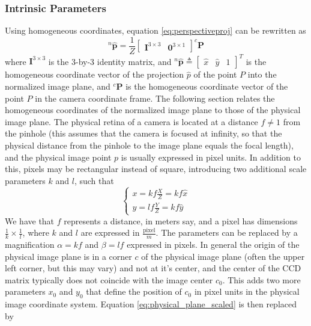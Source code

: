 \subsubsection{Intrinsic Parameters}
\label{section:intrinsic_params}
Using homogeneous coordinates, equation \ref{eq:perspectiveproj} can be rewritten as
\begin{equation}
\label{eq:homo}
^n\mathbf{\hat{p}}=\frac{1}{Z}\begin{bmatrix}\mathbf{I}^{3\times3} & \mathbf{0}^{3\times1}\end{bmatrix}^c\mathbf{P}
\end{equation}
where $\mathbf{I}^{3\times3}$ is the 3-by-3 identity matrix, and $^n\mathbf{\hat{p}}\triangleq \begin{bmatrix}\hat{x}&\hat{y}&1\end{bmatrix}^T$ is the homogeneous coordinate vector of the projection $\hat{p}$ of the point $P$ into the normalized image plane, and $^c\mathbf{P}$ is the homogeneous coordinate vector of the point $P$ in the camera coordinate frame. The following section relates the homogeneous coordinates of the normalized image plane to those of the physical image plane. The physical retina of a camera is located at a distance $f\neq1$ from the pinhole (this assumes that the camera is focused at infinity, so that the physical distance from the pinhole to the image plane equals the focal length), and the physical image point $p$ is usually expressed in pixel units. In addition to this, pixels may be rectangular instead of square, introducing two additional scale parameters $k$ and $l$, such that
\begin{equation}
\label{eq:physical_plane_scaled}
    \begin{cases}
    x=kf\frac{X}{Z}=kf\hat{x}\\
    y=lf\frac{Y}{Z}=kf\hat{y}
    \end{cases}
\end{equation}
We have that $f$ represents a distance, in meters say, and a pixel has dimensions $\frac{1}{k}\times\frac{1}{l}$, where $k$ and $l$ are expressed in $\frac{\text{pixel}}{m}$. The parameters can be replaced by a magnification $\alpha=kf$ and $\beta=lf$ expressed in pixels. In general the origin of the physical image plane is in a corner $c$ of the physical image plane (often the upper left corner, but this may vary) and not at it's center, and the center of the CCD matrix typically does not coincide with the image center $c_0$. This adds two more parameters $x_0$ and $y_0$ that define the position of $c_0$ in pixel units in the physical image coordinate system. Equation \ref{eq:physical_plane_scaled} is then replaced by
